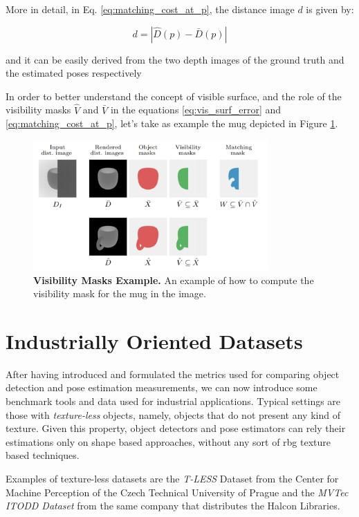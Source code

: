 More in detail, in Eq. \ref{eq:matching_cost_at_p}, the distance image $d$ is given by:

\begin{equation}
    \label{eq:distance_image}
    d = |\hat{D}(p) - \bar{D}(p)|
\end{equation}

and it can be easily derived from the two depth images of the ground truth and the estimated poses respectively

In order to better understand the concept of visible surface, and the role of the visibility masks $\hat{V}$ and $\bar{V}$ in the equations \ref{eq:vis_surf_error} and \ref{eq:matching_cost_at_p}, let's take as example the mug depicted in Figure \ref{fig:visibility_mask_ex}.

\begin{figure}
    \centering
    \includegraphics[width=0.8\textwidth]{figures/2_benchmarks_and_metrics/visibility_mask_ex}
    \caption{\textbf{Visibility Masks Example.} An example of how to compute the visibility mask for the mug in the image.}
    \label{fig:visibility_mask_ex}
\end{figure}

\section{Industrially Oriented Datasets}\label{sec:datasets}
After having introduced and formulated the metrics used for comparing object detection and pose estimation measurements, we can now introduce some benchmark tools and data used for industrial applications. Typical settings are those with \emph{texture-less} objects, namely, objects that do not present any kind of texture. Given this property, object detectors and pose estimators can rely their estimations only on shape based approaches, without any sort of rbg texture based techniques.

Examples of texture-less datasets are the \emph{T-LESS} Dataset \cite{hodan2017tless} from the Center for Machine Perception of the Czech Technical University of Prague and the \emph{MVTec ITODD Dataset} \cite{mvtec2017itodd} from the same company that distributes the Halcon Libraries.

